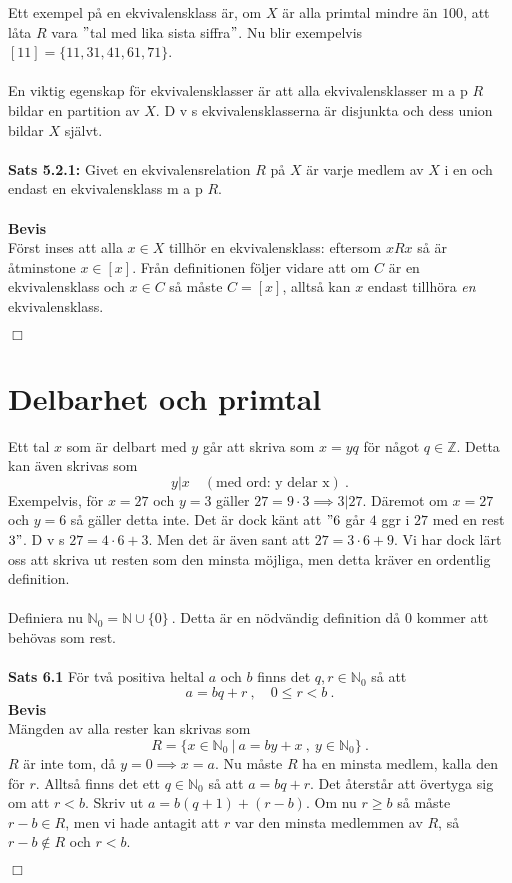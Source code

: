 \documentclass{article}
\begin{document}
Ett exempel på en ekvivalensklass är, om $X$ är alla primtal mindre än $100$, att låta $R$ vara $"$tal med lika sista siffra$"$. Nu blir exempelvis $[11]=\{11,31,41,61,71\}$.\\ \\
En viktig egenskap för ekvivalensklasser är att alla ekvivalensklasser m a p $R$ bildar en partition av $X$. D v s ekvivalensklasserna är disjunkta och dess union bildar $X$ självt.\\ \\
\textbf{Sats 5.2.1:} Givet en ekvivalensrelation $R$ på $X$ är varje medlem av $X$ i en och endast en ekvivalensklass m a p $R$.\\ \\
\textbf{Bevis}\\
Först inses att alla $x\in X$ tillhör en ekvivalensklass: eftersom $xRx$ så är åtminstone $x\in[x]$. Från definitionen följer vidare att om $C$ är en ekvivalensklass och $x\in C$ så måste $C=[x]$, alltså kan $x$ endast tillhöra \textit{en} ekvivalensklass.
\begin{flushright}
$\Box$
\end{flushright}

\section{Delbarhet och primtal}
Ett tal $x$ som är delbart med $y$ går att skriva som $x=yq$ för något $q\in\mathbb{Z}$. Detta kan även skrivas som
$$
y|x \quad (\textrm{med ord: y delar x}) \ .
$$
Exempelvis, för $x=27$ och $y=3$ gäller $27=9\cdot3\implies 3|27$. Däremot om $x=27$ och $y=6$ så gäller detta inte. Det är dock känt att $"6$ går $4$ ggr i $27$ med en rest $3"$. D v s $27=4\cdot6+3$. Men det är även sant att $27=3\cdot6+9$. Vi har dock lärt oss att skriva ut resten som den minsta möjliga, men detta kräver en ordentlig definition.\\ \\  
Definiera nu $\mathbb{N}_0=\mathbb{N}\cup\{0\} \ .$ Detta är en nödvändig definition då $0$ kommer att behövas som rest.\\ \\
\textbf{Sats 6.1} För två positiva heltal $a$ och $b$ finns det $q,r\in\mathbb{N}_0$ så att
$$
a=bq+r \ , \quad 0\leq r <b \ .
$$
\textbf{Bevis}\\
Mängden av alla rester kan skrivas som
$$
R=\{x\in\mathbb{N}_0 \ | \ a=by+x \ , \ y\in\mathbb{N}_0\} \ .
$$
$R$ är inte tom, då $y=0\implies x=a$. Nu måste $R$ ha en minsta medlem, kalla den för $r$. Alltså finns det ett $q\in\mathbb{N}_0$ så att $a=bq+r$. Det återstår att övertyga sig om att $r<b$. Skriv ut $a=b(q+1)+(r-b)$. Om nu $r\geq b$ så måste $r-b\in R$, men vi hade antagit att $r$ var den minsta medlemmen av $R$, så $r-b\notin R$ och $r<b$.
\begin{flushright}
$\Box$
\end{flushright}
\end{document}

